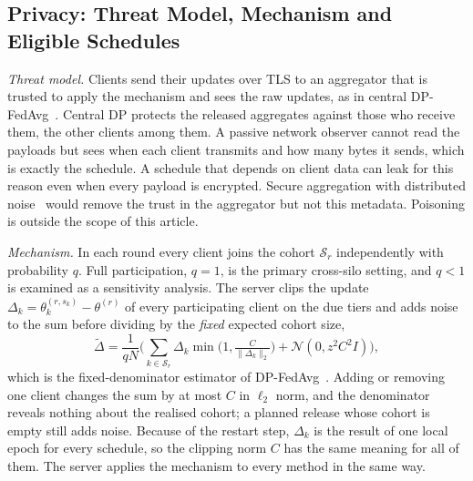 \documentclass[journal]{IEEEtran}
\begin{document}
\subsection{Privacy: Threat Model, Mechanism and Eligible Schedules}
\label{sec:method-privacy}
\emph{Threat model.} Clients send their updates over TLS to an aggregator that is trusted to apply the mechanism and sees the raw updates, as in central DP-FedAvg~\cite{mcmahan2018dp}. Central DP protects the released aggregates against those who receive them, the other clients among them. A passive network observer cannot read the payloads but sees when each client transmits and how many bytes it sends, which is exactly the schedule. A schedule that depends on client data can leak for this reason even when every payload is encrypted. Secure aggregation with distributed noise~\cite{kairouz2021ddg} would remove the trust in the aggregator but not this metadata. Poisoning is outside the scope of this article.

\emph{Mechanism.} In each round every client joins the cohort $\mathcal S_r$ independently with probability $q$. Full participation, $q=1$, is the primary cross-silo setting, and $q<1$ is examined as a sensitivity analysis. The server clips the update $\Delta_k=\theta_k^{(r,s_k)}-\theta^{(r)}$ of every participating client on the due tiers and adds noise to the sum before dividing by the \emph{fixed} expected cohort size,
\begin{equation}
\tilde\Delta=\frac1{qN}\Big(\sum_{k\in\mathcal S_r}\Delta_k\min\big(1,\tfrac{C}{\|\Delta_k\|_2}\big)+\mathcal N(0,z^2C^2I)\Big),
\label{eq:dp}
\end{equation}
which is the fixed-denominator estimator of DP-FedAvg~\cite{mcmahan2018dp}. Adding or removing one client changes the sum by at most $C$ in $\ell_2$ norm, and the denominator reveals nothing about the realised cohort; a planned release whose cohort is empty still adds noise. Because of the restart step, $\Delta_k$ is the result of one local epoch for every schedule, so the clipping norm $C$ has the same meaning for all of them. The server applies the mechanism to every method in the same way.
\end{document}
